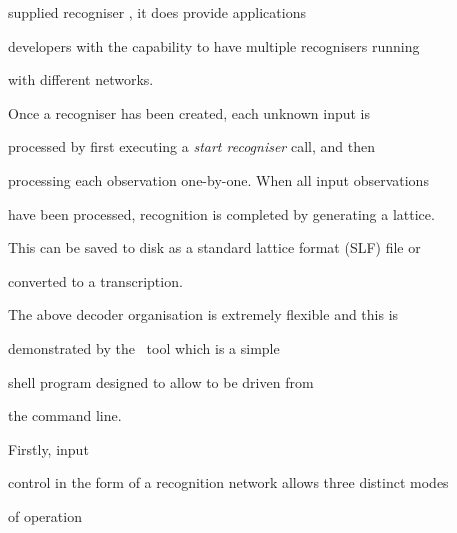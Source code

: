 supplied recogniser , it does provide applications


developers with the capability to have multiple recognisers running


with different networks.





Once a recogniser has been created, each unknown input is 


processed by first executing a \textit{start recogniser} call, and then


processing each observation one-by-one.  When all input observations


have been processed, recognition is completed by generating a lattice.


This can be saved to disk as a standard lattice format (SLF) file or


converted to a transcription.





The above decoder organisation is extremely flexible and this is


demonstrated by the \HTK\ tool  which is a simple 


shell program designed to allow  to be driven from


the command line.  





Firstly, input


control in the form of a recognition network allows three distinct modes


of operation





